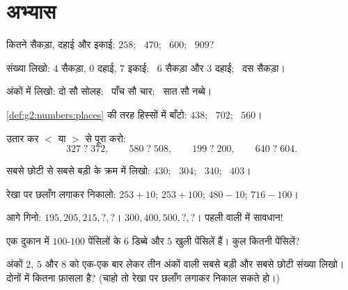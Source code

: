 \section{अभ्यास}

\begin{exercise}[$\star$]\label{exo:g2:numbers:1}
कितने सैकड़ा, दहाई और इकाई: $258$; \ $470$; \ $600$; \
$909$?
\end{exercise}

\begin{exercise}[$\star$]\label{exo:g2:numbers:2}
संख्या लिखो: $4$ सैकड़ा, $0$ दहाई, $7$ इकाई; \ $6$ सैकड़ा
और $3$ दहाई; \ दस सैकड़ा।
\end{exercise}

\begin{exercise}[$\star$]\label{exo:g2:numbers:3}
अंकों में लिखो: दो सौ सोलह; \ पाँच सौ चार; \
सात सौ नब्बे।
\end{exercise}

\begin{exercise}[$\star$]\label{exo:g2:numbers:4}
\cref{def:g2:numbers:places} की तरह हिस्सों में बाँटो: $438$; \ $702$; \
$560$।
\end{exercise}

\begin{exercise}[$\star$]\label{exo:g2:numbers:5}
उतार कर $<$ या $>$ से पूरा करो:
\[
327 \;?\; 372, \qquad
580 \;?\; 508, \qquad
199 \;?\; 200, \qquad
640 \;?\; 604 .
\]
\end{exercise}

\begin{exercise}[$\star$]\label{exo:g2:numbers:6}
सबसे छोटी से सबसे बड़ी के क्रम में लिखो: $430$; \ $304$; \ $340$; \ $403$।
\end{exercise}

\begin{exercise}[$\star$]\label{exo:g2:numbers:7}
रेखा पर छलाँग लगाकर निकालो: $253 + 10$; \quad $253 + 100$;
\quad $480 - 10$; \quad $716 - 100$।
\end{exercise}

\begin{exercise}[$\star$]\label{exo:g2:numbers:8}
आगे गिनो: $195, 205, 215, ?, ?$। \quad
$300, 400, 500, ?, ?$। \quad पहली वाली में सावधान!
\end{exercise}

\begin{exercise}[$\star$]\label{exo:g2:numbers:9}
एक दुकान में $100$-$100$ पेंसिलों के $6$ डिब्बे और $5$ खुली
पेंसिलें हैं। कुल कितनी पेंसिलें?
\end{exercise}

\begin{exercise}[$\star\star$]\label{exo:g2:numbers:10}
अंकों $2$, $5$ और $8$ को एक-एक बार लेकर तीन अंकों वाली सबसे
बड़ी और सबसे छोटी संख्या लिखो। दोनों में कितना फ़ासला है?
(चाहो तो रेखा पर छलाँग लगाकर निकाल सकते हो।)
\end{exercise}
